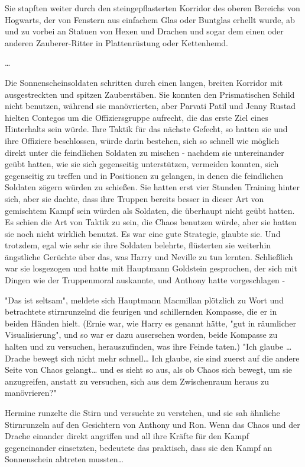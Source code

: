 {Sie stapften weiter durch den steingepflasterten Korridor des oberen Bereichs von Hogwarts, der von Fenstern aus einfachem Glas oder Buntglas erhellt wurde, ab und zu vorbei an Statuen von Hexen und Drachen und sogar dem einen oder anderen Zauberer-Ritter in Plattenrüstung oder Kettenhemd.

…

Die Sonnenscheinsoldaten schritten durch einen langen, breiten Korridor mit ausgestreckten und spitzen Zauberstäben. Sie konnten den Prismatischen Schild nicht benutzen, während sie manövrierten, aber Parvati Patil und Jenny Rustad hielten Contegos um die Offiziersgruppe aufrecht, die das erste Ziel eines Hinterhalts sein würde. Ihre Taktik für das nächste Gefecht, so hatten sie und ihre Offiziere beschlossen, würde darin bestehen, sich so schnell wie möglich direkt unter die feindlichen Soldaten zu mischen - nachdem sie untereinander geübt hatten, wie sie sich gegenseitig unterstützen, vermeiden konnten, sich gegenseitig zu treffen und in Positionen zu gelangen, in denen die feindlichen Soldaten zögern würden zu schießen. Sie hatten erst vier Stunden Training hinter sich, aber sie dachte, dass ihre Truppen bereits besser in dieser Art von gemischtem Kampf sein würden als Soldaten, die überhaupt nicht geübt hatten. Es schien die Art von Taktik zu sein, die Chaos benutzen würde, aber sie hatten sie noch nicht wirklich benutzt. Es war eine gute Strategie, glaubte sie. Und trotzdem, egal wie sehr sie ihre Soldaten belehrte, flüsterten sie weiterhin ängstliche Gerüchte über das, was Harry und Neville zu tun lernten. Schließlich war sie losgezogen und hatte mit Hauptmann Goldstein gesprochen, der sich mit Dingen wie der Truppenmoral auskannte, und Anthony hatte vorgeschlagen -

"Das ist seltsam", meldete sich Hauptmann Macmillan plötzlich zu Wort und betrachtete stirnrunzelnd die feurigen und schillernden Kompasse, die er in beiden Händen hielt. (Ernie war, wie Harry es genannt hätte, "gut in räumlicher Visualisierung", und so war er dazu ausersehen worden, beide Kompasse zu halten und zu versuchen, herauszufinden, was ihre Feinde taten.) "Ich glaube … Drache bewegt sich nicht mehr schnell… Ich glaube, sie sind zuerst auf die andere Seite von Chaos gelangt… und es sieht so aus, als ob Chaos sich bewegt, um sie anzugreifen, anstatt zu versuchen, sich aus dem Zwischenraum heraus zu manövrieren?"

Hermine runzelte die Stirn und versuchte zu verstehen, und sie sah ähnliche Stirnrunzeln auf den Gesichtern von Anthony und Ron. Wenn das Chaos und der Drache einander direkt angriffen und all ihre Kräfte für den Kampf gegeneinander einsetzten, bedeutete das praktisch, dass sie den Kampf an Sonnenschein abtreten mussten…

}
